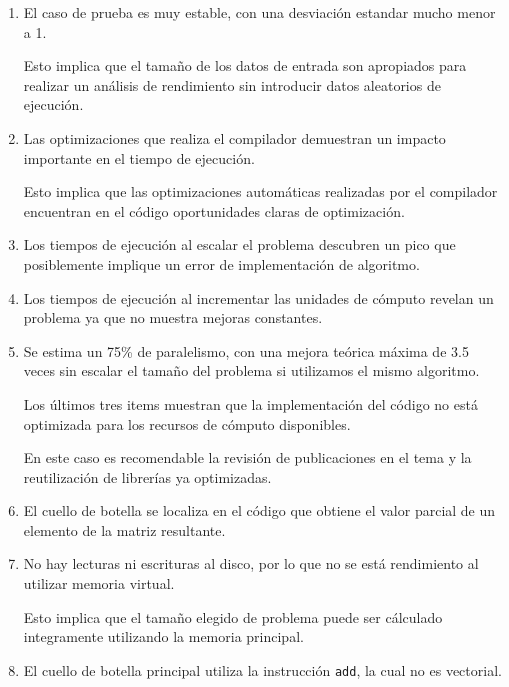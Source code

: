 \documentclass[a4paper]{report}
\begin{document}
\begin{enumerate}

\item El caso de prueba es muy estable, con una desviación estandar mucho menor a 1.

\smallskip

Esto implica que el tamaño de los datos de entrada son apropiados para realizar un análisis de rendimiento sin introducir datos aleatorios de ejecución.

\item Las optimizaciones que realiza el compilador demuestran un impacto importante en el tiempo de ejecución.

\smallskip

Esto implica que las optimizaciones automáticas realizadas por el compilador encuentran en el código oportunidades claras de optimización.

\item Los tiempos de ejecución al escalar el problema descubren un pico que posiblemente implique un error de implementación de algoritmo.

\item Los tiempos de ejecución al incrementar las unidades de cómputo revelan un problema ya que no muestra mejoras constantes.

\item Se estima un 75\% de paralelismo, con una mejora teórica máxima de 3.5 veces sin escalar el tamaño del problema si utilizamos el mismo algoritmo.

\smallskip

Los últimos tres items muestran que la implementación del código no está optimizada para los recursos de cómputo disponibles. 

En este caso es recomendable la revisión de publicaciones en el tema y la reutilización de librerías ya optimizadas.

\item El cuello de botella se localiza en el código que obtiene el valor parcial de un elemento de la matriz resultante.

\item No hay lecturas ni escrituras al disco, por lo que no se está rendimiento al utilizar memoria virtual.

\smallskip

Esto implica que el tamaño elegido de problema puede ser cálculado integramente utilizando la memoria principal.

\item El cuello de botella principal utiliza la instrucción {\tt add}, la cual no es vectorial.


\end{enumerate}
\end{document}
